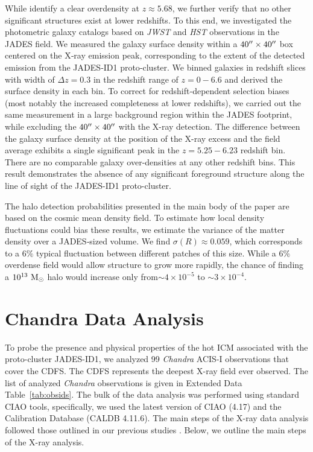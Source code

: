 \documentclass[pdflatex,sn-mathphys-num]{sn-jnl}
\newcommand{\arcsec}{\mbox{\ensuremath{^{\prime\prime}}}}
\theoremstyle{thmstyleone}
\theoremstyle{thmstyletwo}
\theoremstyle{thmstylethree}
\begin{document}
While \cite{2025MNRAS.539.1796L} identify a clear overdensity at $z\approx5.68$, we further verify that no other significant structures exist at lower redshifts. To this end, we investigated the photometric galaxy catalogs based on \textit{JWST} and \textit{HST} observations in the JADES field. We measured the galaxy surface density within a $40\arcsec \times 40\arcsec$  box centered on the X‑ray emission peak, corresponding to the extent of the detected emission from the JADES‑ID1 proto‑cluster. We binned galaxies in redshift slices with width of $\Delta z =0.3$ in the redshift range of $z=0-6.6$ and derived the surface density in each bin. To correct for redshift‑dependent selection biases (most notably the increased completeness at lower redshifts), we carried out the same measurement in a large background region within the JADES footprint, while excluding the $40\arcsec \times 40\arcsec$  with the X-ray detection. The difference between the galaxy surface density at the position of the X-ray excess and the field average exhibits a single significant peak in the $z=5.25-6.23$ redshift bin. There are no comparable galaxy over-densities at any other redshift bins. This result demonstrates the absence of any significant foreground structure along the line of sight of the JADES-ID1 proto-cluster.

The halo detection probabilities presented in the main body of the paper are based on the cosmic mean density field.  To estimate how local density fluctuations could bias these results, we estimate the variance of the matter density over a JADES‐sized volume.  We find $\sigma(R) \approx 0.059$, which corresponds to a $6\%$ typical fluctuation between different patches of this size. While a $6\%$ overdense field would allow structure to grow more rapidly, the chance of finding a $10^{13} \ \rm{M_{\odot}}$ halo would increase only from$\sim4\times10^{-5}$ to  $\sim3\times10^{-4}$.


\section{Chandra Data Analysis}
\label{sec:chandra_data}

To probe the presence and physical properties of the hot ICM associated with the proto-cluster JADES-ID1, we analyzed 99 \textit{Chandra} ACIS-I observations that cover the CDFS. The CDFS represents the deepest X-ray field ever observed. The list of analyzed \textit{Chandra} observations is given in Extended Data Table~\ref{tab:obsids}. The bulk of the data analysis was performed using standard CIAO tools, specifically, we used the latest version of CIAO (4.17) and the Calibration Database (CALDB 4.11.6). The main steps of the X-ray data analysis followed those outlined in our previous studies \cite{2022ApJ...927...34B,2024NatAs...8..126B}. Below, we outline the main steps of the X-ray analysis.
\end{document}
